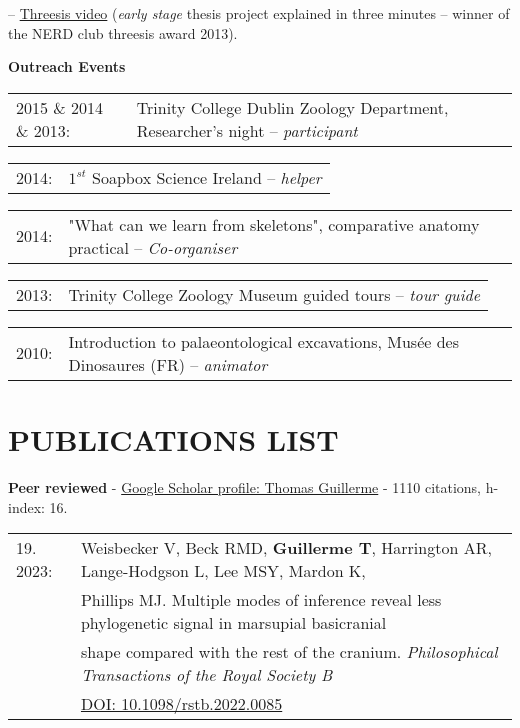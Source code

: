 \documentclass[10pt,a4paper]{article}
\begin{document}
{-- \href{http://www.youtube.com/watch?v=Y3ciaYSvbyU}{Threesis video} (\textit{early stage} thesis project explained in three minutes -- winner of the NERD club threesis award 2013).\\[1.5ex]

\raggedright\textbf{Outreach Events}\\
\begin{tabular}{lp{13cm}}
2015 \& 2014 \& 2013: & Trinity College Dublin Zoology Department, Researcher's night -- \textit{participant}\\
\end{tabular}
\begin{tabular}{ll}
2014: & $1^{st}$ Soapbox Science Ireland -- \textit{helper}\\
\end{tabular}
\begin{tabular}{ll}
2014: & "What can we learn from skeletons", comparative anatomy practical -- \textit{Co-organiser}\\
\end{tabular}
\begin{tabular}{ll}
2013: & Trinity College Zoology Museum guided tours -- \textit{tour guide}\\
\end{tabular}
\begin{tabular}{ll}
2010: & Introduction to palaeontological excavations, Mus\'{e}e des Dinosaures (FR) -- \textit{animator}\\
\end{tabular}
\bigskip

\section{PUBLICATIONS LIST}
\raggedright\textbf{Peer reviewed} - \href{https://scholar.google.co.uk/citations?user=LA9l9EkAAAAJ&hl=en}{Google Scholar profile: Thomas Guillerme} - 1110 citations, h-index: 16.\\[1.5ex]


\begin{tabular}{ll}
19. 2023: & Weisbecker V, Beck RMD, \textbf{Guillerme T}, Harrington AR, Lange-Hodgson L, Lee MSY, Mardon K,\\
      & Phillips MJ. Multiple modes of inference reveal less phylogenetic signal in marsupial basicranial\\
      & shape compared with the rest of the cranium. \textit{Philosophical Transactions of the Royal Society B}\\
      & \href{https://royalsocietypublishing.org/doi/10.1098/rstb.2022.0085}{DOI: 10.1098/rstb.2022.0085}\\
\end{tabular}
\bigskip

}
\end{document}
